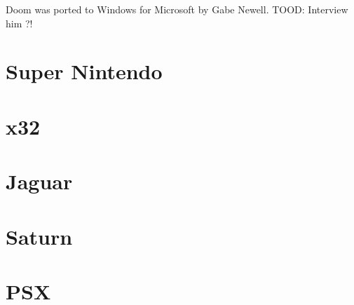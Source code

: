 Doom was ported to Windows for Microsoft by Gabe Newell. TOOD: Interview him ?!
\section{Super Nintendo}
\section{x32}
\section{Jaguar}
\section{Saturn}
\section{PSX}